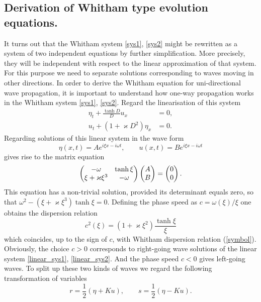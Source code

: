 \subsection{Derivation of Whitham type evolution equations.}
%
It turns out that the Whitham system \eqref{sys1}, \eqref{sys2} might be
rewritten as a system of two independent equations by further simplification.
More precisely, they will be independent with respect to
the linear approximation of that system.
For this purpose we need to separate solutions corresponding
to waves moving in other directions.
In order to derive the Whitham equation for uni-directional wave propagation,
it is important to understand how one-way propagation works in the 
Whitham system \eqref{sys1}, \eqref{sys2}.
Regard the linearisation of this system
%
\begin{align}
\label{linear_sys1}
	\eta_t + \frac{\tanh D}{D} u_x &= 0
	, \\
\label{linear_sys2}
	u_t + ( 1 + \varkappa D^2 ) \eta_x &= 0
	.
\end{align}
%
Regarding solutions of this linear system in the wave form
%
\[
	\eta(x, t) = A e^{ i \xi x - i \omega t }
	, \qquad
	u(x, t) = B e^{ i \xi x - i \omega t }
\]
%
gives rise to the matrix equation
%
\[
	\begin{pmatrix}
		- \omega					&	\tanh \xi
		\cr
		\xi + \varkappa \xi^3	&	- \omega	
	\end{pmatrix}
	\begin{pmatrix}
		A
		\cr
		B
	\end{pmatrix}
	=
	\begin{pmatrix}
		0
		\cr
		0
	\end{pmatrix}
	.
\]
%
This equation has a non-trivial solution, provided
its determinant equals zero, so that
\(
	\omega^2 - ( \xi + \varkappa \xi^3 ) \tanh \xi = 0
\).
Defining the phase speed as $c = \omega(\xi) / \xi$ one obtains
the dispersion relation 
%
\[
	c^2(\xi) = ( 1 + \varkappa \xi^2 ) \frac{\tanh \xi}{\xi}
\]
%
which coincides, up to the sign of $c$, with Whitham dispersion
relation (\ref{symbol}).
Obviously, the choice $c > 0$ corresponds to right-going wave solutions
of the linear system \eqref{linear_sys1}, \eqref{linear_sys2}.
And the phase speed $c < 0$ gives left-going waves.
To split up these two kinds of waves we regard the following
transformation of variables
%
\begin{equation}
\label{variable_transformation}
	r = \frac 12 (\eta + K  u)
	, \qquad
	s = \frac 12 (\eta - K  u)
	. 
\end{equation}
